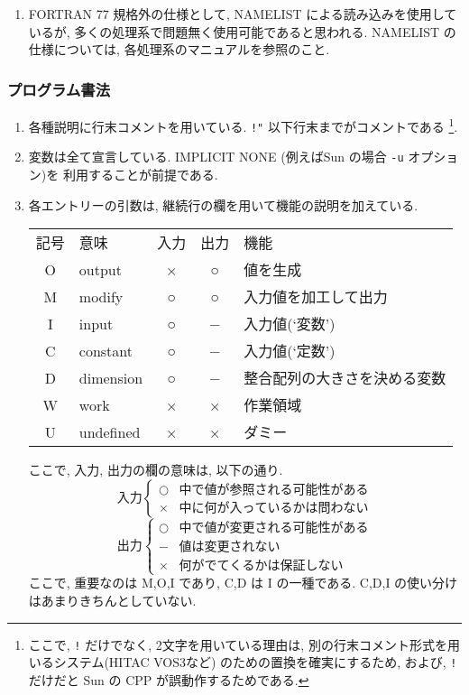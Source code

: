 \begin{enumerate}
\item FORTRAN 77 規格外の仕様として,
  NAMELIST による読み込みを使用しているが,
  多くの処理系で問題無く使用可能であると思われる.
  NAMELIST の仕様については, 各処理系のマニュアルを参照のこと.

\end{enumerate}


\subsubsection{プログラム書法}

\begin{enumerate}
\item 各種説明に行末コメントを用いている. 
  \verb+!"+ 以下行末までがコメントである 
  \footnote{ここで,  \texttt{!} だけでなく, 2文字を用いている理由は, 
            別の行末コメント形式を用いるシステム(HITAC VOS3など)
            のための置換を確実にするため, および,
            \texttt{!} だけだと Sun の CPP が誤動作するためである.}.

\item 変数は全て宣言している. 
  IMPLICIT NONE (例えばSun の場合 {\tt -u} オプション)を
  利用することが前提である.

\item 各エントリーの引数は, 継続行の欄を用いて機能の説明を加えている. 
\begin{center}
    \begin{tabular}{clccl} 
    記号 & 意味      & 入力 & 出力 & 機能     \\
    O    & output    &  ×  &  ○  & 値を生成 \\
    M    & modify    &  ○  &  ○  & 入力値を加工して出力 \\
    I    & input     &  ○  &  −  & 入力値(`変数') \\
    C    & constant  &  ○  &  −  & 入力値(`定数') \\
    D    & dimension &  ○  &  −  & 整合配列の大きさを決める変数 \\
    W    & work      &  ×  &  ×  & 作業領域 \\
    U    & undefined &  ×  &  ×  & ダミー 
    \end{tabular}

ここで, 入力, 出力の欄の意味は, 以下の通り.
\[
    入力 \left\{
    \begin{array}{ll}   
      ○ &  中で値が参照される可能性がある \\
      × &  中に何が入っているかは問わない
    \end{array}  
     \right.
\]
\[
    出力 \left\{
    \begin{array}{ll}   
      ○ &  中で値が変更される可能性がある \\
      − &  値は変更されない \\
      × &  何がでてくるかは保証しない
    \end{array}  
     \right.
\]
ここで, 重要なのは M,O,I であり, C,D は I の一種である.
C,D,I の使い分けはあまりきちんとしていない.
\end{center}



\end{enumerate}
